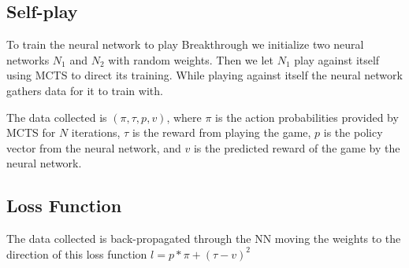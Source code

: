 \subsection{Self-play}

To train the neural network to play Breakthrough we initialize two neural networks $N_1$ and $N_2$ 
with random weights. Then we let $N_1$ play against itself using MCTS to direct its training. 
While playing against itself the neural network gathers data for it to train with. 

The data collected is $(\pi, \tau, p, v)$, where $\pi$ is the action probabilities provided by 
MCTS for $N$ iterations, $\tau$ is the reward from playing the game, $p$ is the policy vector
from the neural network, and $v$ is the predicted reward of the game by the neural network.

\subsection{Loss Function}

The data collected is back-propagated through the NN moving the weights to the direction of this 
loss function $l = p * \pi + (\tau - v)^2$